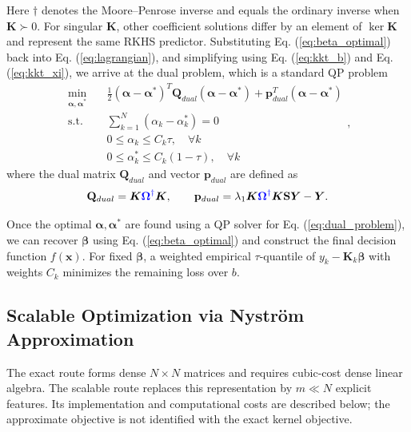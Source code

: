 \documentclass[a4paper]{cas-sc}
\begin{document}
{\color{blue}Here $\dagger$ denotes the Moore--Penrose inverse and equals the ordinary inverse when $\boldsymbol{K}\succ0$. For singular $\boldsymbol{K}$, other coefficient solutions differ by an element of $\ker\boldsymbol{K}$ and represent the same RKHS predictor.}
Substituting Eq. (\ref{eq:beta_optimal}) back into Eq. (\ref{eq:lagrangian}), and simplifying using Eq. (\ref{eq:kkt_b}) and Eq. (\ref{eq:kkt_xi}), we arrive at the dual problem, which is a standard QP problem
\begin{equation}
\label{eq:dual_problem}
\begin{aligned}
\min_{\boldsymbol{\alpha}, \boldsymbol{\alpha}^*} \quad & \frac{1}{2} (\boldsymbol{\alpha} - \boldsymbol{\alpha}^*)^T \mathbf{Q}_{dual} (\boldsymbol{\alpha} - \boldsymbol{\alpha}^*) + \mathbf{p}_{dual}^T (\boldsymbol{\alpha} - \boldsymbol{\alpha}^*) \\
\text{s.t.} \quad & \sum_{k=1}^N (\alpha_k - \alpha_k^*) = 0 \\
& 0 \le \alpha_k \le C_k \tau, \quad \forall k \\
& 0 \le \alpha_k^* \le C_k (1-\tau), \quad \forall k
\end{aligned},
\end{equation}
where the dual matrix $\mathbf{Q}_{dual}$ and vector $\mathbf{p}_{dual}$ are defined as
\begin{equation}
\label{eq:dual_matrices}
\mathbf{Q}_{dual}=\boldsymbol{K}{\color{blue}\boldsymbol{\Omega}^{\dagger}}\boldsymbol{K},\qquad \mathbf{p}_{dual}=\lambda_1\boldsymbol{K}{\color{blue}\boldsymbol{\Omega}^{\dagger}}\boldsymbol{K}\mathbf{S}\boldsymbol{Y}-\boldsymbol{Y}.
\end{equation}

Once the optimal $\boldsymbol{\alpha}, \boldsymbol{\alpha}^*$ are found using a QP solver for Eq. (\ref{eq:dual_problem}), we can recover $\boldsymbol{\beta}$ using Eq. (\ref{eq:beta_optimal}) and construct the final decision function $f(\boldsymbol{x})$. {\color{blue}For fixed $\boldsymbol{\beta}$, a weighted empirical $\tau$-quantile of $y_k-\boldsymbol{K}_k\boldsymbol{\beta}$ with weights $C_k$ minimizes the remaining loss over $b$.}



\subsection{Scalable Optimization via Nystr\"{o}m Approximation}\label{fast_alg}
{\color{blue}The exact route forms dense $N\times N$ matrices and requires cubic-cost dense linear algebra. The scalable route replaces this representation by $m\ll N$ explicit features. Its implementation and computational costs are described below; the approximate objective is not identified with the exact kernel objective.}
\end{document}
